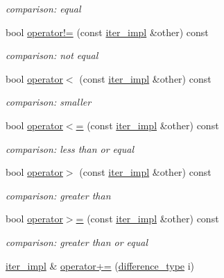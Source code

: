 \begin{DoxyCompactItemize}
\begin{DoxyCompactList}\small\item\em comparison\+: equal \end{DoxyCompactList}\item 
bool \hyperlink{classnlohmann_1_1detail_1_1iter__impl_aeab0e2b5da70b3bdebecd5b1a6ee66a6}{operator!=} (const \hyperlink{classnlohmann_1_1detail_1_1iter__impl}{iter\+\_\+impl} \&other) const
\begin{DoxyCompactList}\small\item\em comparison\+: not equal \end{DoxyCompactList}\item 
bool \hyperlink{classnlohmann_1_1detail_1_1iter__impl_a0d14cd76203e00bdcef6a64a5d055cc7}{operator$<$} (const \hyperlink{classnlohmann_1_1detail_1_1iter__impl}{iter\+\_\+impl} \&other) const
\begin{DoxyCompactList}\small\item\em comparison\+: smaller \end{DoxyCompactList}\item 
bool \hyperlink{classnlohmann_1_1detail_1_1iter__impl_ac6f71b36d7c87e427d1fee83f2600fad}{operator$<$=} (const \hyperlink{classnlohmann_1_1detail_1_1iter__impl}{iter\+\_\+impl} \&other) const
\begin{DoxyCompactList}\small\item\em comparison\+: less than or equal \end{DoxyCompactList}\item 
bool \hyperlink{classnlohmann_1_1detail_1_1iter__impl_aaf3620b8dfa4bed8a9ac2b51dd55dbd7}{operator$>$} (const \hyperlink{classnlohmann_1_1detail_1_1iter__impl}{iter\+\_\+impl} \&other) const
\begin{DoxyCompactList}\small\item\em comparison\+: greater than \end{DoxyCompactList}\item 
bool \hyperlink{classnlohmann_1_1detail_1_1iter__impl_a634f85da575cb60b012a687efa26e11a}{operator$>$=} (const \hyperlink{classnlohmann_1_1detail_1_1iter__impl}{iter\+\_\+impl} \&other) const
\begin{DoxyCompactList}\small\item\em comparison\+: greater than or equal \end{DoxyCompactList}\item 
\hyperlink{classnlohmann_1_1detail_1_1iter__impl}{iter\+\_\+impl} \& \hyperlink{classnlohmann_1_1detail_1_1iter__impl_a3eef94f9d167046e7f773aeb6b78090c}{operator+=} (\hyperlink{classnlohmann_1_1detail_1_1iter__impl_a2f7ea9f7022850809c60fc3263775840}{difference\+\_\+type} i)

\end{DoxyCompactItemize}
